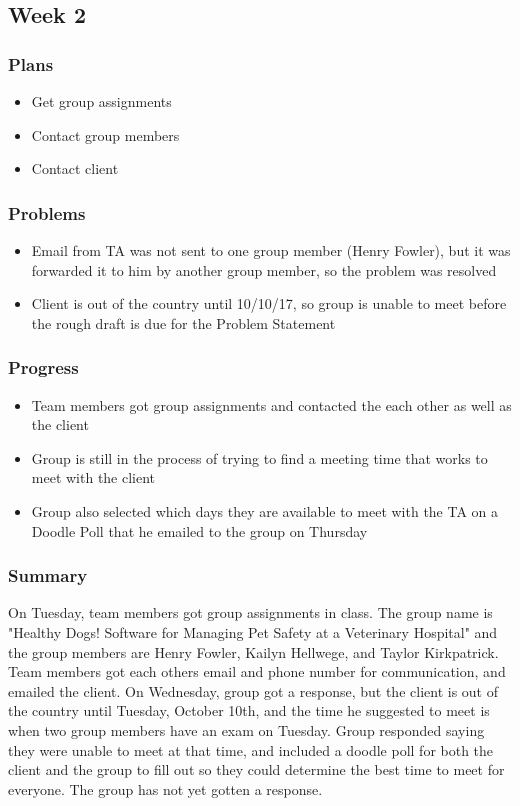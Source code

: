 \documentclass[onecolumn, draftclsnofoot,10pt, compsoc]{IEEEtran}
\begin{document}
\subsection{Week 2}

\subsubsection{Plans}
\begin{itemize}
\item Get group assignments 
\item Contact group members
\item Contact client
\end{itemize}

\subsubsection{Problems}
\begin{itemize}
\item Email from TA was not sent to one group member (Henry Fowler), but it was forwarded it to him by another group member, so the problem was resolved
\item Client is out of the country until 10/10/17, so group is unable to meet before the rough draft is due for the Problem Statement
\end{itemize}


\subsubsection{Progress}
\begin{itemize}
\item Team members got group assignments and contacted the each other as well as the client
\item Group is still in the process of trying to find a meeting time that works to meet with the client
\item Group also selected which days they are available to meet with the TA on a Doodle Poll that he emailed to the group on Thursday
\end{itemize}
 
\subsubsection{Summary}
On Tuesday, team members got group assignments in class. The group name  is "Healthy Dogs! Software for Managing Pet Safety at a Veterinary Hospital" and the group members are Henry Fowler, Kailyn Hellwege,  and Taylor Kirkpatrick. Team members got each others email and phone number for communication, and emailed the client. On Wednesday, group got a response, but the client is out of the country until Tuesday, October 10th, and the time he suggested to meet is when two group members have an exam on Tuesday. Group responded saying they were unable to meet at that time, and included a doodle poll for both the client and the group to fill out so they could determine the best time to meet for everyone. The group has not yet gotten a response. 
\end{document}
